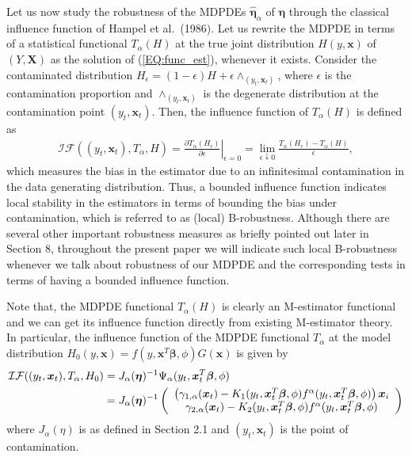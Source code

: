 \documentclass[a4paper]{article}%
\newtheorem{theorem}{Theorem}
\begin{document}
Let us now study the robustness of the MDPDEs $\widehat{\boldsymbol{\eta}%
}_{\alpha}$ of $\boldsymbol{\eta}$ through the classical influence function of
Hampel et al.~(1986). Let us rewrite the MDPDE in terms of a statistical
functional $T_{\alpha}(H)$ at the true joint distribution $H(y,\boldsymbol{x}%
)$ of $(Y, \textbf{X})$ as the solution of (\ref{EQ:func_est}), whenever it exists.
Consider the contaminated distribution $H_{\epsilon}= (1-\epsilon)H +
\epsilon\wedge_{(y_{t},\boldsymbol{x}_{t})}$, where $\epsilon$ is the
contamination proportion and $\wedge_{(y_{t},\boldsymbol{x}_{t})}$ is the
degenerate distribution at the contamination point ${(y_{t},\boldsymbol{x}%
_{t})}$. Then, the influence function of $T_{\alpha}(H)$ is defined as
\begin{align}
\mathcal{IF}((y_{t},\boldsymbol{x}_{t}),T_{\alpha},H) = \left.  \frac{\partial
T_{\alpha}(H_{\epsilon})}{\partial\epsilon}\right\vert _{\epsilon=0} =
\lim\limits_{\epsilon\downarrow0} \frac{T_{\alpha}(H_{\epsilon}) - T_{\alpha
}(H)}{\epsilon},
\end{align}
which measures the bias in the estimator due to an infinitesimal
contamination in the data generating distribution.
Thus, a bounded influence function indicates local stability in the estimators
in terms of bounding the bias under contamination, which is referred to as (local) B-robustness.
Although there are several other important robustness measures as briefly pointed out later in Section 8,
throughout the present paper we will indicate such local B-robustness whenever we talk about robustness
of our MDPDE and the corresponding tests in terms of having a bounded influence function. 


Note that, the MDPDE functional $T_{\alpha}(H)$ is clearly an M-estimator
functional and we can get its influence function directly from existing
M-estimator theory.
In particular, the influence function of the MDPDE functional $T_{\alpha}$ at
the model distribution $H_{0}(y,\boldsymbol{x})=f(y,\boldsymbol{x}%
^{T}\boldsymbol{\beta}, \phi)G(\boldsymbol{x})$ is given by
\begin{align}
\mathcal{IF}((y_{t},\boldsymbol{x}_{t}),T_{\alpha},H_{0})  &  = J_{\alpha
}(\boldsymbol{\eta})^{-1} \Psi_{\alpha}(y_{t},\boldsymbol{x}_{t}%
^{T}\boldsymbol{\beta},\phi)\nonumber\\
&  = J_{\alpha}(\boldsymbol{\eta})^{-1}\left(
\begin{array}
[c]{c}%
\left(  \gamma_{1,\alpha}(\boldsymbol{x}_{t})- K_{1}(y_{t},\boldsymbol{x}%
_{t}^{T}\boldsymbol{\beta},\phi)f^{\alpha}(y_{t},\boldsymbol{x}_{t}%
^{T}\boldsymbol{\beta},\phi)\right)  \boldsymbol{x}_{i}\\
\gamma_{2,\alpha}(\boldsymbol{x}_{t})- K_{2}(y_{t},\boldsymbol{x}_{t}%
^{T}\boldsymbol{\beta},\phi)f^{\alpha}(y_{t},\boldsymbol{x}_{t}^{T}%
\boldsymbol{\beta},\phi)
\end{array}
\right)
\end{align}
where $J_{\alpha}(\eta)$ is as defined in Section 2.1 and $(y_{t}%
,\boldsymbol{x}_{t})$ is the point of contamination.
\end{document}
